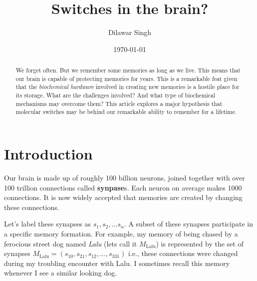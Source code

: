 \documentclass[]{resonance}
\title{Switches in the brain?}
\author{Dilawar Singh}
\date{\today}
\begin{document}
\maketitle



\begin{abstract}

    We forget often. But we remember some memories as long as we live.
    This means that our brain is capable of protecting memories for years.
    This is a remarkable feat given that the \emph{biochemical hardware}
    involved in creating new memories is a hostile place for
    its storage.  What are the challenges involved? And what type of 
    biochemical mechanisms may overcome them? This article explores a major
    hypothesis that molecular switches may be behind our remarkable ability to
    remember for a lifetime.

\end{abstract}

\maketitle
{}

\section{Introduction}\label{sec:intro}

Our brain is made up of roughly 100 billion neurons, joined together with over
100 trillion connections called \textbf{synpase}s. Each neuron on average makes
1000 connections. It is now widely accepted that memories are created by
changing these connections. 

Let's label these synapses as $s_1, s_2, \ldots s_n$. A subset of these synapses
participate in a specific memory formation. For example, my memory of being
chased by a ferocious street dog named \emph{Lalu} (lets call it
$M_\text{Lalu}$) is represented by the set of synapses
$M_\text{Lalu}=(s_{10}, s_{21}, s_{12},\ldots,s_{331})$ i.e., these connections
were changed during my troubling encounter with Lalu. I sometimes recall this
memory whenever I see a similar looking dog. 
\end{document}
